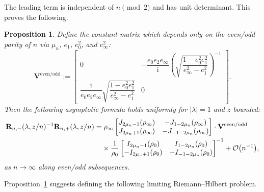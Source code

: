 \documentclass[pdftex]{sigma}
\numberwithin{equation}{section}
\newtheorem{prop}[Theorem]{Proposition}
 { \theoremstyle{definition}
\newtheorem{Definition}[Theorem]{Definition}
\newtheorem{Note}[Theorem]{Note}
\newtheorem{Example}[Theorem]{Example}
\newtheorem{Remark}[Theorem]{Remark} }
\newcommand{\ii}{\mathrm{i}}
\begin{document}
The leading term is independent of $n\pmod{2}$ and has unit determinant. This proves the following.
\begin{prop}
Define the constant matrix which depends only on the even/odd parity of $n$ via $\mu_n$, $e_1$, $e_0^2$, and $e_\infty^2$:
\begin{equation}
 \mathbf{V}^\mathrm{even/odd}:=\begin{bmatrix} 0 & -\dfrac{e_0 e_2 e_\infty}{\ii} \left(\sqrt{\dfrac{1 - e_0^2 e_1^2}{e_\infty^2-e_1^2 } }\right)^{-1} \\
 \dfrac{ \ii }{e_0 e_2 e_\infty} \sqrt{\dfrac{1 - e_0^2 e_1^2}{e_\infty^2-e_1^2 }} & 0
\end{bmatrix}.
 \label{eq:Vm-even}
\end{equation}
Then the following asymptotic formula holds uniformly for $|\lambda|=1$ and $z$ bounded:
\begin{align*}
& \mathbf{R}_{n,-}(\lambda,z/n)^{-1}\mathbf{R}_{n,+}(\lambda,z/n)= {\rho_\infty}\begin{bmatrix}J_{2\mu_n - 1}(\rho_\infty) & -J_{1- 2\mu_n}(\rho_\infty)\\
 J_{2\mu_n +1}(\rho_\infty) & -J_{-1-2\mu_n}(\rho_\infty)\end{bmatrix}\cdot\mathbf{V}^\mathrm{even/odd}\\
&\hphantom{\mathbf{R}_{n,-}(\lambda,z/n)^{-1}\mathbf{R}_{n,+}(\lambda,z/n)=}{}
\times
 \dfrac{1}{\rho_0}\begin{bmatrix}I_{2\mu_n - 1}(\rho_0) & I_{1- 2\mu_n}(\rho_0)\\
 -I_{2\mu_n +1}(\rho_0) & -I_{-1-2\mu_n}(\rho_0)\end{bmatrix}^{-1}+\mathcal{O}\big(n^{-1}\big),
\end{align*}
as $n\to\infty$ along even/odd subsequences.
\label{prop:limiting-jump}
\end{prop}
Proposition~\ref{prop:limiting-jump} suggests defining the following limiting Riemann--Hilbert problem.
\end{document}
